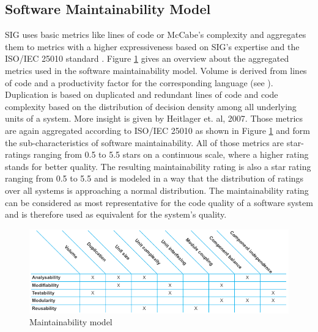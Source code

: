 \subsection{Software Maintainability Model}
SIG uses basic metrics like lines of code or McCabe's complexity and aggregates them to metrics with a higher expressiveness based on SIG's expertise \cite{heitlager2007practical} and the ISO/IEC 25010 standard \cite{iso25010}. Figure \ref{fig:mmodel} gives an overview about the aggregated metrics used in the software maintainability model. 
Volume is derived from lines of code and a productivity factor for the corresponding language (see \cite{jones1996programming}). Duplication is based on duplicated and redundant lines of code and code complexity based on the distribution of decision density among all underlying units of a system. More insight is given by Heitlager et. al, 2007. 
Those metrics are again aggregated according to ISO/IEC 25010 as shown in Figure \ref{fig:mmodel} and form the sub-characteristics of software maintainability. All of those metrics are star-ratings ranging from 0.5 to 5.5 stars on a continuous scale, where a higher rating stands for better quality. The resulting maintainability rating is also a star rating ranging from 0.5 to 5.5 and is modeled in a way that the distribution of ratings over all systems is approaching a normal distribution. The maintainability rating can be considered as most representative for the code quality of a software system and is therefore used as equivalent for the system's quality.

\begin{figure}[!htb]
  \centering
  \includegraphics[width=1\linewidth]{figs/mmodel.png}
  \caption{Maintainability model}
  \label{fig:mmodel}
\end{figure}

